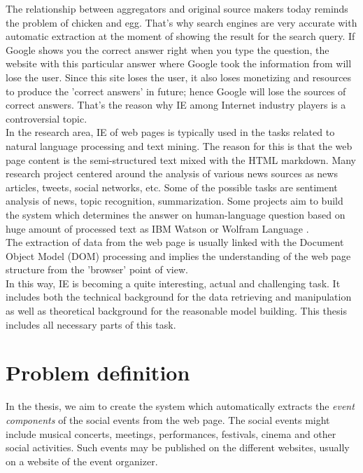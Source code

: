 The relationship between aggregators and original source makers today reminds the problem of chicken and egg. That's why search engines are very accurate with automatic extraction at the moment of showing the result for the search query. If Google shows you the correct answer right when you type the question, the website with this particular answer where Google took the information from will lose the user. Since this site loses the user, it also loses monetizing and resources to produce the 'correct answers' in future; hence Google will lose the sources of correct answers. That's the reason why IE among Internet industry players is a controversial topic.\\

In the research area, IE of web pages is typically used in the tasks related to natural language processing and text mining. The reason for this is that the web page content is the semi-structured text mixed with the HTML markdown. Many research project centered around the analysis of various news sources as news articles, tweets, social networks, etc. Some of the possible tasks are sentiment analysis of news, topic recognition, summarization. Some projects aim to build the system which determines the answer on human-language question based on huge amount of processed text as IBM Watson \cite{IBMAlchemy} or Wolfram Language \cite{Wolfram}.\\      

The extraction of data from the web page is usually linked with the Document Object Model (DOM) processing and implies the understanding of the web page structure from the 'browser' point of view. \\

In this way, IE is becoming a quite interesting, actual and challenging task. It includes both the technical background for the data retrieving and manipulation as well as theoretical background for the reasonable model building. This thesis includes all necessary parts of this task.

\section{Problem definition}
In the thesis, we aim to create the system which automatically extracts the \textit{event components} of the social events from the web page. The social events might include musical concerts, meetings, performances, festivals, cinema and other social activities. Such events may be published on the different websites, usually on a website of the event organizer.\\

